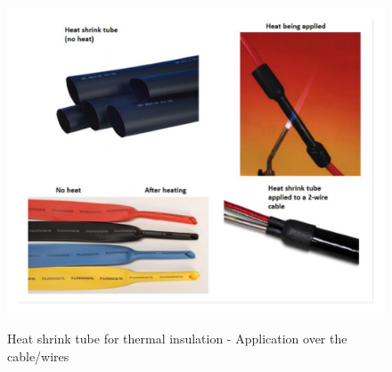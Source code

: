 \begin{figure}
  \centering
  \includegraphics[angle=90,width=1\columnwidth]{figs/body02/FIGDEVICEUTILITYHEATSHRINK2.pdf}\\
  \caption[Heat shrink tube for thermal insulation - Application over the cable/wires]{Heat shrink tube for thermal insulation - Application over the cable/wires}
  \label{FIG:DEVICEUTILITYHEATSHRINK2}
\end{figure}
